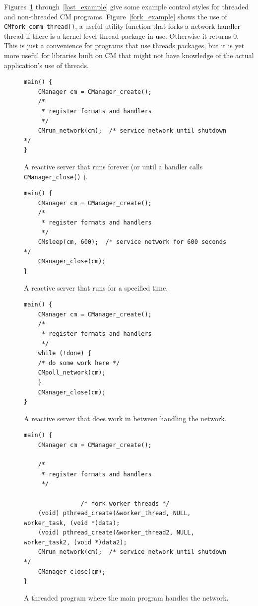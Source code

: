 \documentclass[11pt]{article}
\begin{document}
Figures~\ref{first_example} through~\ref{last_example} give some example
control styles for threaded and non-threaded CM programs.
Figure~\ref{fork_example} shows the use of {\tt CMfork\_comm\_thread()}, a
useful utility function that forks a network handler thread if there is a
kernel-level thread package in use.  Otherwise it returns 0.  This is just a
convenience for programs that use threads packages, but it is yet more
useful for libraries built on CM that might not have knowledge of the actual
application's use of threads.
\begin{figure}[p]
\center\begin{BVerbatim}
main() {
    CManager cm = CManager_create();
    /* 
     * register formats and handlers
     */
    CMrun_network(cm);  /* service network until shutdown */
}
\end{BVerbatim}
\caption{A reactive server that runs forever (or until a handler calls {\tt
CManager\_close()} ).\label{first_example}}
\end{figure}
\begin{figure}
\center\begin{BVerbatim}
main() {
    CManager cm = CManager_create();
    /*
     * register formats and handlers
     */
    CMsleep(cm, 600);  /* service network for 600 seconds */
    CManager_close(cm);
}
\end{BVerbatim}
\caption{A reactive server that runs for a specified time.}
\end{figure}
\begin{figure}
\center\begin{BVerbatim}
main() {
    CManager cm = CManager_create();
    /*
     * register formats and handlers
     */
    while (!done) {
	/* do some work here */
	CMpoll_network(cm);
    }
    CManager_close(cm);
}
\end{BVerbatim}
\caption{A reactive server that does work in between handling the network.}
\end{figure}
\begin{figure}
\center\begin{BVerbatim}
main() {
    CManager cm = CManager_create();

    /*
     * register formats and handlers
     */

                /* fork worker threads */
    (void) pthread_create(&worker_thread, NULL, worker_task, (void *)data); 
    (void) pthread_create(&worker_thread2, NULL, worker_task2, (void *)data2); 
    CMrun_network(cm);  /* service network until shutdown */
    CManager_close(cm);
}
\end{BVerbatim}
\caption{A threaded program where the main program handles the network.}
\end{figure}
\end{document}
